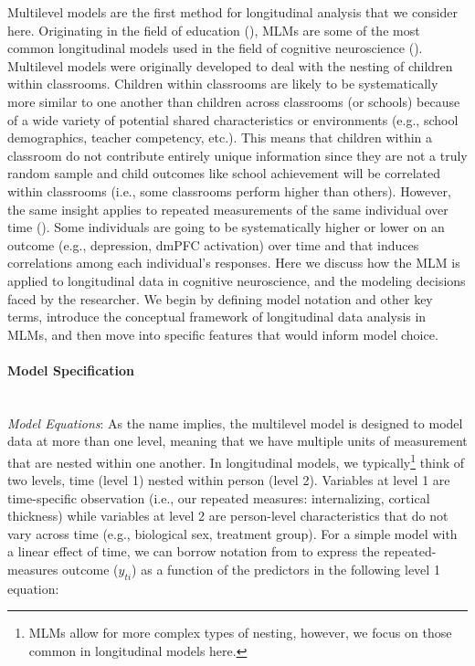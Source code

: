 \documentclass[11pt]{article}
\newcommand{\subsubsubsection}[1]{\paragraph{#1}\mbox{}\\}  %
\begin{document}
Multilevel models are the first method for longitudinal analysis that we consider here. Originating in the field of education (\cite{raudenbush_hierarchical_2002}), MLMs are some of the most common longitudinal models used in the field of cognitive neuroscience (\cite{braams_longitudinal_2015,campbell_longitudinal_2009,martin_longitudinal_2019,mccormick_multi-level_2021,mccormick_longitudinal_2021,peters_longitudinal_2016,peters_increased_2017,telzer_methodological_2018}). Multilevel models were originally developed to deal with the nesting of children within classrooms. Children within classrooms are likely to be systematically more similar to one another than children across classrooms (or schools) because of a wide variety of potential shared characteristics or environments (e.g., school demographics, teacher competency, etc.). This means that children within a classroom do not contribute entirely unique information since they are not a truly random sample and child outcomes like school achievement will be correlated within classrooms (i.e., some classrooms perform higher than others). However, the same insight applies to repeated measurements of the same individual over time (\cite{raudenbush_hierarchical_2002}). Some individuals are going to be systematically higher or lower on an outcome (e.g., depression, dmPFC activation) over time and that induces correlations among each individual’s responses. Here we discuss how the MLM is applied to longitudinal data in cognitive neuroscience, and the modeling decisions faced by the researcher. We begin by defining model notation and other key terms, introduce the conceptual framework of longitudinal data analysis in MLMs, and then move into specific features that would inform model choice.

\subsubsubsection{Model Specification}
\qquad \textit{Model Equations}: As the name implies, the multilevel model is designed to model data at more than one level, meaning that we have multiple units of measurement that are nested within one another. In longitudinal models, we typically\footnote{MLMs allow for more complex types of nesting, however, we focus on those common in longitudinal models here.} think of two levels, time (level 1) nested within person (level 2). Variables at level 1 are time-specific observation (i.e., our repeated measures: internalizing, cortical thickness) while variables at level 2 are person-level characteristics that do not vary across time (e.g., biological sex, treatment group). For a simple model with a linear effect of time, we can borrow notation from \textcite{curran_disaggregation_2011} to express the repeated-measures outcome (\textcolor{PineGreen}{$y_{ti}$}) as a function of the predictors in the following level 1 equation:
\end{document}
